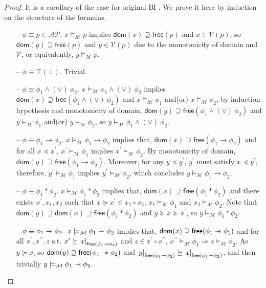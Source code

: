 \documentclass[conference,compsoc, 10pt]{IEEEtran}
\newcommand {\cM } {{\mathcal{M}}}
\newcommand {\cV } {{\mathcal{V}}}
\newcommand {\Ldom }[1] {{\mathsf{dom}\!\left(#1\right)}}
\newcommand {\Lfree }[1] {{\mathsf{free}{\left(#1\right)}}}
\newcommand {\rt }[2] {{\left.{#1}\right|_{#2}}}
\newcommand {\sepimp} {\mathrel{-\mkern-6mu*}}
\newcommand {\AP} {{\mathcal{AP}}}
\begin{document}
\begin{appendices}
\begin{proof}
			It is a corollary of the case for original BI \cite{OP99,Pym02}. 
			We prove it here by induction on the structure of the formulas.
			\begin{itemize}
				\item[--] $\phi \equiv p\in\AP.$ $x\models_\cM p$ implies $\Ldom{x}\supseteq\Lfree{p}$ and $x\in\cV(p)$, so $\Ldom{y}\supseteq\Lfree{p}$ and $y\in\cV(p)$ due to the monotonicity of domain and $\cV$, or equivalently, $y\models_\cM p$.
				\item[--] $\phi\equiv \top (\bot)$. Trivial.
				\item[--] $\phi \equiv \phi_1\wedge\!(\vee)\ \phi_2.$ $x\models_\cM \phi_1\wedge\!(\vee)\ \phi_2$ implies $\Ldom{x}\supseteq\Lfree{\phi_1\wedge\!(\vee)\ \phi_2}$ and $x\models_\cM \phi_1$ and(or) $x\models_\cM \phi_2$, by induction hypothesis and monotonicity of domain, $\Ldom{y}\supseteq\Lfree{\phi_1\wedge\!(\vee)\ \phi_2}$ and $y\models_\cM \phi_1$ and(or) $y\models_\cM \phi_2$, so $y\models_\cM \phi_1\wedge\!(\vee)\ \phi_2$.
				\item[--] $\phi \equiv \phi_1\rightarrow\phi_2.$ $x\models_\cM \phi_1\rightarrow\phi_2$ implies that, $\Ldom{x}\supseteq\Lfree{\phi_1\rightarrow\phi_2}$ and for all $x\preceq x^\prime$, $x^\prime\models_\cM\phi_1$ implies $x^\prime\models_\cM\phi_2$. By monotonicity of domain, $\Ldom{y}\supseteq\Lfree{\phi_1\rightarrow\phi_2}$. Moreover, for any $y\preceq y^\prime$, $y^\prime$ must satisfy $x\preceq y^\prime$, therefore, $y^\prime\models_\cM\phi_1$ implies $y^\prime\models_\cM\phi_2$, which concludes $y\models_\cM \phi_1\rightarrow\phi_2$.
				\item[--] $\phi \equiv \phi_1\ast\phi_2.$ $x\models_\cM \phi_1\ast \phi_2$ implies that, $\Ldom{x}\supseteq\Lfree{\phi_1\ast\phi_2}$ and there exists $x^\prime, x_1, x_2$ such that $x\succeq x^\prime\in x_1\circ x_2$, $x_1\models_\cM\phi_1$ and $x_2\models_\cM\phi_2$. 
				Note that $\Ldom{y}\supseteq\Ldom{x}\supseteq\Lfree{\phi_1\ast\phi_2}$ and $y\succeq x\succeq x^\prime$, so $y\models_\cM \phi_1\ast\phi_2$. \\
				\item[--] $\phi \equiv \phi_1\sepimp \phi_2.$ $x\models_\cM \phi_1\sepimp \phi_2$ implies that, $\Ldom{x}\supseteq\Lfree{\phi_1\sepimp \phi_2}$ and for all $x^\prime,x^{\prime\prime},z$ s.t. $x^\prime\succeq \rt{x}{\Lfree{\phi_1\sepimp\phi_2}}$ and $z\in x^\prime\circ x^{\prime\prime}$, $x^{\prime\prime}\models_\cM \phi_1\Rightarrow z\models_\cM \phi_2$. As $y\succeq x$, so $\Ldom{y}\supseteq\Lfree{\phi_1\sepimp \phi_2}$ and $\rt{y}{\Lfree{\phi_1\sepimp \phi_2}}\succeq \rt{x}{\Lfree{\phi_1\sepimp \phi_2}}$, and then trivially $y\models_\cM \phi_1\sepimp \phi_2$. 
			\end{itemize}
			

\end{proof}
\end{appendices}
\end{document}
